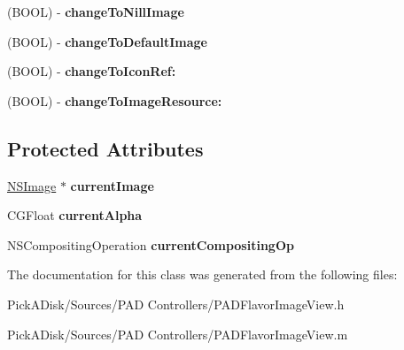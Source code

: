 \begin{DoxyCompactItemize}
\item 
\hypertarget{interface_p_a_d_simple_image_view_a068ee8b2fca0ecce4c092da1f7b92b08}{
(BOOL) -\/ {\bfseries changeToNillImage}}
\label{interface_p_a_d_simple_image_view_a068ee8b2fca0ecce4c092da1f7b92b08}

\item 
\hypertarget{interface_p_a_d_simple_image_view_ab5398267e5b2f85881a89dc22ef286c0}{
(BOOL) -\/ {\bfseries changeToDefaultImage}}
\label{interface_p_a_d_simple_image_view_ab5398267e5b2f85881a89dc22ef286c0}

\item 
\hypertarget{interface_p_a_d_simple_image_view_a772508d79eb0c85573c2264e0e4eb2c7}{
(BOOL) -\/ {\bfseries changeToIconRef:}}
\label{interface_p_a_d_simple_image_view_a772508d79eb0c85573c2264e0e4eb2c7}

\item 
\hypertarget{interface_p_a_d_simple_image_view_a0feab4eabeabb3d43486370ad7406136}{
(BOOL) -\/ {\bfseries changeToImageResource:}}
\label{interface_p_a_d_simple_image_view_a0feab4eabeabb3d43486370ad7406136}

\end{DoxyCompactItemize}
\subsection*{Protected Attributes}
\begin{DoxyCompactItemize}
\item 
\hypertarget{interface_p_a_d_simple_image_view_a6f6791b85156c7de041be3fdb678cd71}{
\hyperlink{class_n_s_image}{NSImage} $\ast$ {\bfseries currentImage}}
\label{interface_p_a_d_simple_image_view_a6f6791b85156c7de041be3fdb678cd71}

\item 
\hypertarget{interface_p_a_d_simple_image_view_a68dddc0c3fff6d369aab6983ddc36d3f}{
CGFloat {\bfseries currentAlpha}}
\label{interface_p_a_d_simple_image_view_a68dddc0c3fff6d369aab6983ddc36d3f}

\item 
\hypertarget{interface_p_a_d_simple_image_view_a95e312e0be4d1e8b4b84cbea1745ab8a}{
NSCompositingOperation {\bfseries currentCompositingOp}}
\label{interface_p_a_d_simple_image_view_a95e312e0be4d1e8b4b84cbea1745ab8a}

\end{DoxyCompactItemize}


The documentation for this class was generated from the following files:\begin{DoxyCompactItemize}
\item 
PickADisk/Sources/PAD Controllers/PADFlavorImageView.h\item 
PickADisk/Sources/PAD Controllers/PADFlavorImageView.m\end{DoxyCompactItemize}
